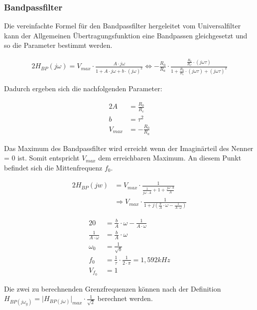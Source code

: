 \newpage

\subsubsection{Bandpassfilter}

Die vereinfachte Formel für den Bandpassfilter hergeleitet vom Universalfilter kann der Allgemeinen Übertragungsfunktion eine Bandpassen gleichgesetzt und so die Parameter bestimmt werden.


\begin{alignat}{2}
H_{BP}(j\omega) = V_{max} \cdot \frac{A \cdot j\omega}{1 + A \cdot j \omega + b \cdot (j\omega)^2} \Longleftrightarrow - \frac{R_{0}}{R_{a}} \cdot \frac{\frac{R_{0}}{R_{C}} \cdot (j\omega \tau)}{1 + \frac{R_{0}}{R_{c}} \cdot (j\omega \tau) + (j\omega \tau)^2}
\end{alignat}

Dadurch ergeben sich die nachfolgenden Parameter:

\begin{alignat}{2}
A &= \frac{R_{0}}{R_{c}}\\
b &= \tau^2\\
V_{max} &= - \frac{R_{0}}{R_{a}}
\end{alignat}

\noindent Das Maximum des Bandpassfilter wird erreicht wenn der Imaginärteil des Nenner = 0 ist. Somit entspricht $V_{max}$ dem erreichbaren Maximum. An diesem Punkt befindet sich die Mittenfrequenz $f_{0}$. 

\begin{alignat}{2}
H_{BP}(jw) &= V_{max} \cdot \frac{1}{\frac{1}{j\omega \cdot A} + 1 + \frac{j\omega \cdot b }{A}}\\
&\Rightarrow V_{max} \cdot \frac{1}{1 + j \left(\frac{b}{A}\cdot \omega - \frac{1}{A \cdot \omega} \right)}
\end{alignat}

\begin{alignat}{2}
	0 &= \frac{b}{A} \cdot \omega - \frac{1}{A \cdot \omega}\\
	\frac{1}{A \cdot \omega} &= \frac{b}{A} \cdot \omega\\
	\omega_{0} &= \frac{1}{\sqrt{b}}\\
	f_{0} &= \frac{1}{\tau} \cdot \frac{1}{2 \cdot \pi} = 1,592 kHz\\
	V_{f_{0}} &= 1
\end{alignat}

\noindent Die zwei zu berechnenden Grenzfrequenzen können nach der Definition $H_{BP (j \omega_{g})} = \lvert H_{BP (j \omega)} \rvert_{max} \cdot \frac{1}{\sqrt{2}}$ berechnet werden.


